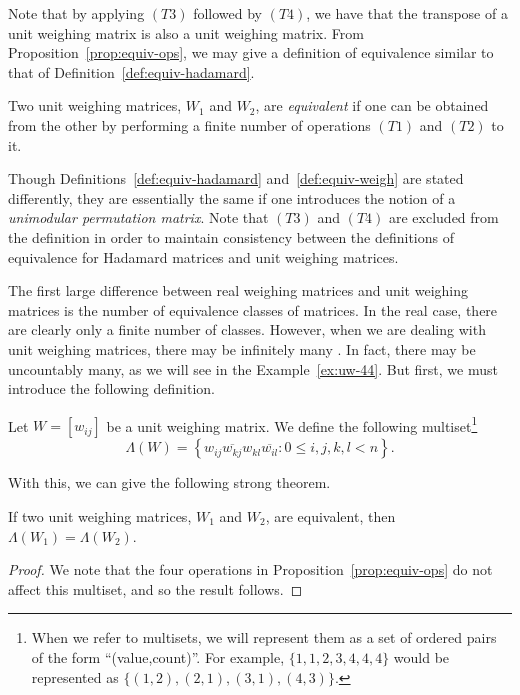 Note that by applying $(T3)$ followed by $(T4)$, we have that the transpose of a unit weighing matrix is also a unit weighing matrix. From Proposition~\ref{prop:equiv-ops}, we may give a definition of equivalence similar to that of Definition~\ref{def:equiv-hadamard}.

\begin{definition} \label{def:equiv-weigh}
 Two unit weighing matrices, $W_1$ and $W_2$, are {\it equivalent} if one can be obtained from the other 
by performing a finite number of  operations $(T1)$ and $(T2)$ to it.
\end{definition}

Though Definitions~\ref{def:equiv-hadamard} and~\ref{def:equiv-weigh} are stated differently, they are essentially the same if one introduces the notion of a {\it unimodular permutation matrix}. Note that $(T3)$ and $(T4)$ are excluded from the definition in order to maintain consistency between the definitions of equivalence for Hadamard matrices and unit weighing matrices.

The first large difference between real weighing matrices and unit weighing matrices is the number of equivalence classes of matrices. In the real case, there are clearly only a finite number of classes. However, when we are dealing with unit weighing matrices, there may be infinitely many . In fact, there may be uncountably many, as we will see in the Example~\ref{ex:uw-44}. But first, we must introduce the following definition.

\begin{definition} \label{def:haargerup-inv}
 Let $W = [w_{ij}]$ be a unit weighing matrix. We define the following multiset\footnote{When we refer to multisets, we will represent them as a set of ordered pairs of the form ``(value,count)''. For example, $\{1,1,2,3,4,4,4\}$ would be represented as $\{(1,2),(2,1),(3,1),(4,3)\}$.}
$$\Lambda(W) = \left\{w_{ij}\overline{w_{kj}}w_{kl}\overline{w_{il}} :0 \leq i,j,k,l < n\right\}.$$
\end{definition}

With this, we can give the following strong theorem.

\begin{theorem} \label{th:equiv-haargerup}
 If two unit weighing matrices, $W_1$ and $W_2$, are equivalent, then $\Lambda(W_1) = \Lambda(W_2)$.
 \begin{proof}
  We note that the four operations in Proposition~\ref{prop:equiv-ops} do not affect this multiset, and so the result follows.
 \end{proof}

\end{theorem}

